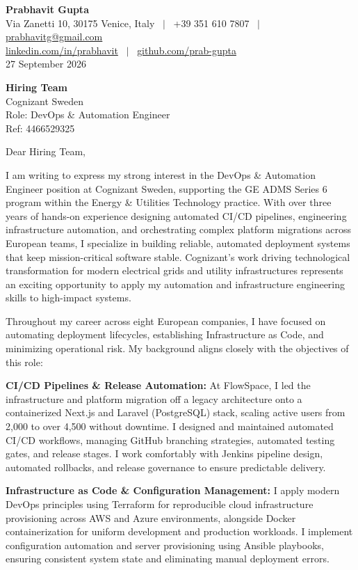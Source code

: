 \documentclass[11pt,a4paper]{article}
\begin{document}
\textbf{\large Prabhavit Gupta}\\
Via Zanetti 10, 30175 Venice, Italy ~$\vert$~ +39 351 610 7807 ~$\vert$~ \href{mailto:prabhavitg@gmail.com}{prabhavitg@gmail.com}\\
\href{https://www.linkedin.com/in/prabhavit/}{linkedin.com/in/prabhavit} ~$\vert$~ \href{https://github.com/prab-gupta}{github.com/prab-gupta}\\
27 September 2026

\textbf{Hiring Team}\\
Cognizant Sweden\\
Role: DevOps \& Automation Engineer\\
Ref: 4466529325

Dear Hiring Team,

I am writing to express my strong interest in the DevOps \& Automation Engineer position at Cognizant Sweden, supporting the GE ADMS Series 6 program within the Energy \& Utilities Technology practice. With over three years of hands-on experience designing automated CI/CD pipelines, engineering infrastructure automation, and orchestrating complex platform migrations across European teams, I specialize in building reliable, automated deployment systems that keep mission-critical software stable. Cognizant's work driving technological transformation for modern electrical grids and utility infrastructures represents an exciting opportunity to apply my automation and infrastructure engineering skills to high-impact systems.

Throughout my career across eight European companies, I have focused on automating deployment lifecycles, establishing Infrastructure as Code, and minimizing operational risk. My background aligns closely with the objectives of this role:

\textbf{CI/CD Pipelines \& Release Automation:} At FlowSpace, I led the infrastructure and platform migration off a legacy architecture onto a containerized Next.js and Laravel (PostgreSQL) stack, scaling active users from 2,000 to over 4,500 without downtime. I designed and maintained automated CI/CD workflows, managing GitHub branching strategies, automated testing gates, and release stages. I work comfortably with Jenkins pipeline design, automated rollbacks, and release governance to ensure predictable delivery.

\textbf{Infrastructure as Code \& Configuration Management:} I apply modern DevOps principles using Terraform for reproducible cloud infrastructure provisioning across AWS and Azure environments, alongside Docker containerization for uniform development and production workloads. I implement configuration automation and server provisioning using Ansible playbooks, ensuring consistent system state and eliminating manual deployment errors.
\end{document}
